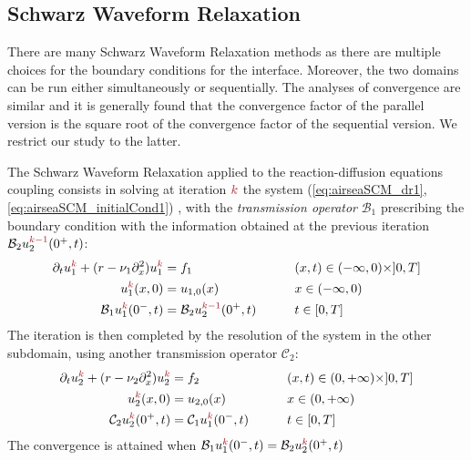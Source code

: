 \subsection{Schwarz Waveform Relaxation}
There are many Schwarz Waveform Relaxation methods
as there are multiple choices for the
boundary conditions for the interface. Moreover,
the two domains can be run either simultaneously or
sequentially. The analyses of convergence are similar and it
is generally found that the convergence factor of the parallel
version is the square root of the convergence factor
of the sequential version. We restrict our study to the latter.
\par
The Schwarz Waveform Relaxation applied to
the reaction-diffusion equations coupling consists in solving
at iteration ${\emphase{k}}$ the system
(\ref{eq:airseaSCM_dr1}, \ref{eq:airseaSCM_initialCond1})
, with the \textit{transmission operator}
${\mathcal B}_1$ prescribing the boundary condition
with the information obtained at the
previous iteration ${\mathcal B}_2 u_2^{\emphase{k-1}}(0^+,t)$:
\begin{subequations}
\begin{align}
	\partial_t u^{{\emphase{k}}}_1 +( r - \nu_1 \partial_x^2) u^{\emphase{k}}_1 &= f_1  &\qquad& (x,t) \in (-\infty,0) \times ]0,T]  \\
	u_1^{\emphase{k}}(x,0) &= u_{1,0}(x)   &\qquad&  x \in (-\infty,0)  \\
	{\mathcal B}_1 u_1^{\emphase{k}}(0^-,t) &= {\mathcal B}_2 u_2^{\emphase{k-1}}(0^+,t) &\qquad& t \in [0,T] 
\end{align}
\label{eq:airseaSCM_SWR-for-u1}
\end{subequations}
The iteration is then completed by the resolution
of the system in the other subdomain, using another
transmission operator ${\mathcal C}_2$:
\begin{subequations}
\begin{align}
	\partial_t u^{\emphase{k}}_2 + ( r - \nu_2 \partial_x^2) u^{\emphase{k}}_2  &= f_2  &\qquad& (x,t) \in (0,+\infty) \times ]0,T] \\
	u^{\emphase{k}}_2(x,0) &= u_{2,0}(x)   &\qquad&  x \in (0,+\infty) \\
	{\mathcal C}_2 u_2^{\emphase{k}}(0^+,t) &= {\mathcal C}_1 u_1^{{\emphase{k}}}(0^-,t) &\qquad& t \in [0,T] \label{eq:airseaSCM_SWR-for-u2-interface}
\end{align}
\label{eq:airseaSCM_SWR-for-u2}
\end{subequations}
The convergence is attained
when ${\mathcal B}_1 u_1^{\emphase{k}}(0^-,t) = {\mathcal B}_2 u_2^{{\emphase{k}}}(0^+,t)$
